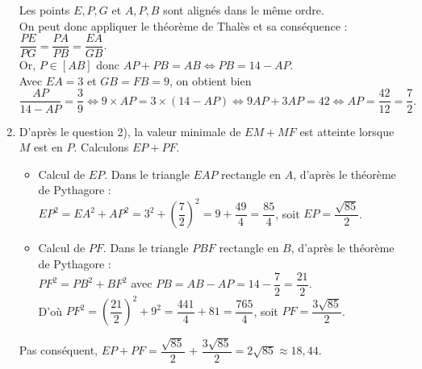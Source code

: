 \begin{enumerate}
      Les points $E, P, G$ et $A, P, B$ sont alignés dans le même ordre. \\
      On peut donc appliquer le théorème de Thalès et sa conséquence : $\dfrac{PE}{PG} =\dfrac{PA}{PB}  =\dfrac{EA}{GB}$. \\
      Or, $P\in[AB]$ donc $AP+PB =AB \iff PB =14-AP$. \\
      Avec $EA =3$ et $GB =FB =9$, on obtient bien \quad {}
      $\dfrac{AP}{14-AP} =\dfrac{3}{9} \iff 9\times AP =3\times(14-AP) \iff 9AP+3AP =42 \iff AP =\dfrac{42}{12} =\dfrac{7}{2}.$ \\ [1mm]
   \item D'après le question 2), la valeur minimale de $EM+MF$ est atteinte lorsque $M$ est en $P$. Calculons $EP+PF$.
   \begin{itemize}
      \item Calcul de $EP$. Dans le triangle $EAP$ rectangle en $A$, d'après le théorème de Pythagore : \\
      $EP^2 = EA^2 + AP^2=3^2+\left(\dfrac72\right)^2=9+\dfrac{49}{4}=\dfrac{85}{4}$, \quad soit $EP =\dfrac{\sqrt{85}}{2}$.
      \item Calcul de $PF$. Dans le triangle $PBF$ rectangle en $B$, d'après le théorème de Pythagore : \\
      $PF^2 =PB^2+BF^2$ avec $PB =AB-AP =14-\dfrac72 =\dfrac{21}{2}$. \\
      D'où  $PF^2=\left(\dfrac{21}{2}\right)^2+9^2 =\dfrac{441}{4}+81=\dfrac{765}{4}$, \quad soit $PF=\dfrac{3\sqrt{85}}{2}$. \\
   \end{itemize}
   Pas conséquent, $EP+PF =\dfrac{\sqrt{85}}{2}$ + $\dfrac{3\sqrt{85}}{2} =2\sqrt{85}\approx 18,44$. \\
   \end{enumerate}
